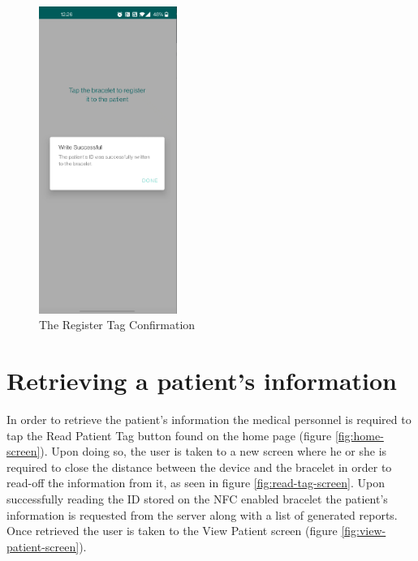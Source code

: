 \begin{figure}
\centering
\includegraphics[width=0.4\textwidth]{figures/write_tag_confirmation.png}
\caption{The Register Tag Confirmation}
\label{fig:write-tag-confirmation}
\end{figure}

\section{Retrieving a patient's information}
\label{sec:ch5sec4}

\par In order to retrieve the patient's information the medical personnel is required to tap the Read Patient Tag button found on the home page (figure \ref{fig:home-screen}). Upon doing so, the user is taken to a new screen where he or she is required to close the distance between the device and the bracelet in order to read-off the information from it, as seen in figure \ref{fig:read-tag-screen}. Upon successfully reading the ID stored on the NFC enabled bracelet the patient's information is requested from the server along with a list of generated reports. Once retrieved the user is taken to the View Patient screen (figure \ref{fig:view-patient-screen}).

